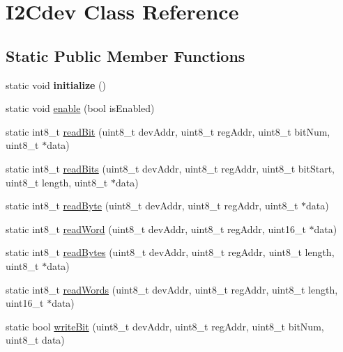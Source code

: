 \hypertarget{class_i2_cdev}{}\section{I2\+Cdev Class Reference}
\label{class_i2_cdev}
\subsection*{Static Public Member Functions}
\begin{DoxyCompactItemize}
\item 
\mbox{\label{class_i2_cdev_a125a49c5f890f40119fc5fc158bc7c69}} 
static void {\bfseries initialize} ()
\item 
static void \mbox{\hyperlink{class_i2_cdev_ab1fc6fb228f54f717cf317646a5751fc}{enable}} (bool is\+Enabled)
\item 
static int8\+\_\+t \mbox{\hyperlink{class_i2_cdev_ac10d46777131c57b8446e70ed85561ec}{read\+Bit}} (uint8\+\_\+t dev\+Addr, uint8\+\_\+t reg\+Addr, uint8\+\_\+t bit\+Num, uint8\+\_\+t $\ast$data)
\item 
static int8\+\_\+t \mbox{\hyperlink{class_i2_cdev_aedf16ba82e784a6b8b82cd7c0fbd9159}{read\+Bits}} (uint8\+\_\+t dev\+Addr, uint8\+\_\+t reg\+Addr, uint8\+\_\+t bit\+Start, uint8\+\_\+t length, uint8\+\_\+t $\ast$data)
\item 
static int8\+\_\+t \mbox{\hyperlink{class_i2_cdev_acff006382342043511e9dca5399dc7e1}{read\+Byte}} (uint8\+\_\+t dev\+Addr, uint8\+\_\+t reg\+Addr, uint8\+\_\+t $\ast$data)
\item 
static int8\+\_\+t \mbox{\hyperlink{class_i2_cdev_a3c03c7a2d3c09fe2bac737df7d91ee6d}{read\+Word}} (uint8\+\_\+t dev\+Addr, uint8\+\_\+t reg\+Addr, uint16\+\_\+t $\ast$data)
\item 
static int8\+\_\+t \mbox{\hyperlink{class_i2_cdev_aada1b34c7fc381954d0398b7b5883c5a}{read\+Bytes}} (uint8\+\_\+t dev\+Addr, uint8\+\_\+t reg\+Addr, uint8\+\_\+t length, uint8\+\_\+t $\ast$data)
\item 
static int8\+\_\+t \mbox{\hyperlink{class_i2_cdev_a6e26c6e3fa9640d336cbcce4dc22e7f9}{read\+Words}} (uint8\+\_\+t dev\+Addr, uint8\+\_\+t reg\+Addr, uint8\+\_\+t length, uint16\+\_\+t $\ast$data)
\item 
static bool \mbox{\hyperlink{class_i2_cdev_aa68890af87de5471d32e583ebbd91acb}{write\+Bit}} (uint8\+\_\+t dev\+Addr, uint8\+\_\+t reg\+Addr, uint8\+\_\+t bit\+Num, uint8\+\_\+t data)
\item 

\end{DoxyCompactItemize}
